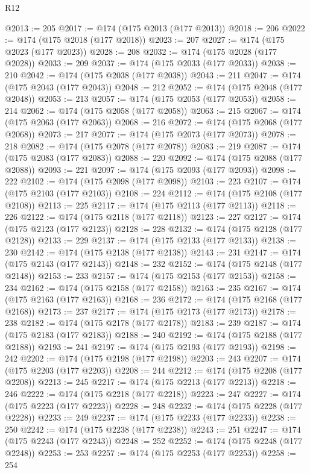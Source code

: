 \begin{lexlean}{R12}
\begin{coremodule}
{{{{{{{{{{{{{{{{{{{{{{{{{{{{{{{{{{{{{{{{{{{{{{{{{{{{{{{{{{{{{{{{{{{{{{{{{{{{{{{{{{{{{{{{{{{{{{{{{{{{{{{{{{@2013 := 205
@2017 := @174 (@175 @2013 (@177 @2013))
@2018 := 206
@2022 := @174 (@175 @2018 (@177 @2018))
@2023 := 207
@2027 := @174 (@175 @2023 (@177 @2023))
@2028 := 208
@2032 := @174 (@175 @2028 (@177 @2028))
@2033 := 209
@2037 := @174 (@175 @2033 (@177 @2033))
@2038 := 210
@2042 := @174 (@175 @2038 (@177 @2038))
@2043 := 211
@2047 := @174 (@175 @2043 (@177 @2043))
@2048 := 212
@2052 := @174 (@175 @2048 (@177 @2048))
@2053 := 213
@2057 := @174 (@175 @2053 (@177 @2053))
@2058 := 214
@2062 := @174 (@175 @2058 (@177 @2058))
@2063 := 215
@2067 := @174 (@175 @2063 (@177 @2063))
@2068 := 216
@2072 := @174 (@175 @2068 (@177 @2068))
@2073 := 217
@2077 := @174 (@175 @2073 (@177 @2073))
@2078 := 218
@2082 := @174 (@175 @2078 (@177 @2078))
@2083 := 219
@2087 := @174 (@175 @2083 (@177 @2083))
@2088 := 220
@2092 := @174 (@175 @2088 (@177 @2088))
@2093 := 221
@2097 := @174 (@175 @2093 (@177 @2093))
@2098 := 222
@2102 := @174 (@175 @2098 (@177 @2098))
@2103 := 223
@2107 := @174 (@175 @2103 (@177 @2103))
@2108 := 224
@2112 := @174 (@175 @2108 (@177 @2108))
@2113 := 225
@2117 := @174 (@175 @2113 (@177 @2113))
@2118 := 226
@2122 := @174 (@175 @2118 (@177 @2118))
@2123 := 227
@2127 := @174 (@175 @2123 (@177 @2123))
@2128 := 228
@2132 := @174 (@175 @2128 (@177 @2128))
@2133 := 229
@2137 := @174 (@175 @2133 (@177 @2133))
@2138 := 230
@2142 := @174 (@175 @2138 (@177 @2138))
@2143 := 231
@2147 := @174 (@175 @2143 (@177 @2143))
@2148 := 232
@2152 := @174 (@175 @2148 (@177 @2148))
@2153 := 233
@2157 := @174 (@175 @2153 (@177 @2153))
@2158 := 234
@2162 := @174 (@175 @2158 (@177 @2158))
@2163 := 235
@2167 := @174 (@175 @2163 (@177 @2163))
@2168 := 236
@2172 := @174 (@175 @2168 (@177 @2168))
@2173 := 237
@2177 := @174 (@175 @2173 (@177 @2173))
@2178 := 238
@2182 := @174 (@175 @2178 (@177 @2178))
@2183 := 239
@2187 := @174 (@175 @2183 (@177 @2183))
@2188 := 240
@2192 := @174 (@175 @2188 (@177 @2188))
@2193 := 241
@2197 := @174 (@175 @2193 (@177 @2193))
@2198 := 242
@2202 := @174 (@175 @2198 (@177 @2198))
@2203 := 243
@2207 := @174 (@175 @2203 (@177 @2203))
@2208 := 244
@2212 := @174 (@175 @2208 (@177 @2208))
@2213 := 245
@2217 := @174 (@175 @2213 (@177 @2213))
@2218 := 246
@2222 := @174 (@175 @2218 (@177 @2218))
@2223 := 247
@2227 := @174 (@175 @2223 (@177 @2223))
@2228 := 248
@2232 := @174 (@175 @2228 (@177 @2228))
@2233 := 249
@2237 := @174 (@175 @2233 (@177 @2233))
@2238 := 250
@2242 := @174 (@175 @2238 (@177 @2238))
@2243 := 251
@2247 := @174 (@175 @2243 (@177 @2243))
@2248 := 252
@2252 := @174 (@175 @2248 (@177 @2248))
@2253 := 253
@2257 := @174 (@175 @2253 (@177 @2253))
@2258 := 254
}}}}}}}}}}}}}}}}}}}}}}}}}}}}}}}}}}}}}}}}}}}}}}}}}}}}}}}}}}}}}}}}}}}}}}}}}}}}}}}}}}}}}}}}}}}}}}}}}}}}}}}}}}
\end{coremodule}
\end{lexlean}
